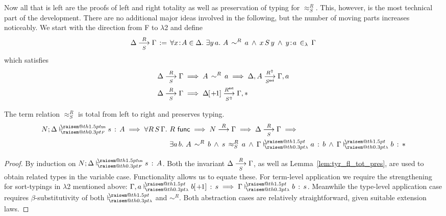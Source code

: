 \documentclass[a4paper,UKenglish]{lipics-v2016}
\makeatletter
\newcommand{\ms}{\,}
\newcommand{\mrel}[1]{\mathrel{\ms #1 \ms}}
\newcommand{\OF}{\mrel{:}}
\newcommand{\mAnd}{\mrel{\wedge}}
\newcommand{\mAll}[1]{\ensuremath{\forall} #1.\ms\ms}
\newcommand{\mEx}[1]{\ensuremath{\exists} #1.\ms\ms}
\newcommand{\eqdef}{\mrel{:=}}
\newcommand{\SysL}{$\lambda$2\xspace}
\newcommand{\tm}{\mathsf{tm}}
\newcommand{\of}{\ensuremath{\!:\!}}
\newcommand{\cc}[2]{#1;#2} %
\newcommand{\raisemath}[1]{\mathpalette{\raisem@th{#1}}}
\newcommand{\raisem@th}[3]{\raisebox{#1}{\ensuremath{#2#3}}}
\newcommand{\tsAnnot}[2]{\vdash\hspace{-.7em}^{\raisemath{1.5pt}{\scriptscriptstyle{#2}}}_{\raisemath{0.3pt}{\scriptscriptstyle{#1}}}} %
\newcommand{\tyF}{\tsAnnot{F}{\tm}}  %
\newcommand{\typingF}[3]{\ensuremath{{#1} \mathrel{\tyF} #2 \OF #3}}
\newcommand{\tyL}{\tsAnnot{\lambda}{}} %
\newcommand{\typingL}[3]{\ensuremath{{#1} \mathrel{\tyL} #2 \OF #3}}
\newcommand{\inL}{\mrel{\in_{\lambda}}}
\newcommand{\tyr}{\mathrel{\sim}}
\newcommand{\tmr}{\mathrel{\approx}}
\newcommand{\Rext}[1]{\ensuremath{#1^{\mathsf{ext}}}}
\newcommand{\Rshift}[1]{\ensuremath{#1^{\Uparrow}}}
\newcommand{\tyctxrelFL}[3]{\ensuremath{#1\mathrel{\mathop{\longrightarrow}^{#2}\limits}#3}}
\newcommand{\tmctxrelFL}[4]{\ensuremath{#1\mathrel{\mathop{\longrightarrow}^{#2}_{#3}\limits}#4}}
\newcommand{\Prp}{\ensuremath{\textrm{\textasteriskcentered}}}
\newcommand{\subst}[1]{\hphantom{|}\!\![{#1}]}
\newcommand{\shift}{\ensuremath{\hspace{0.1em}\mathsf{+}\hspace{0.08em}\!1}}
\makeatother
\begin{document}
Now all that is left are the proofs of left and right totality as well as preservation of typing for $\tmr^R_S$.
This, however, is the most technical part of the development.
There are no additional major ideas involved in the following, but the number of moving parts increases noticeably.
We start with the direction from F to \SysL and define
\begin{align*}
  \tmctxrelFL{\Delta}{R}{S}{\Gamma} \eqdef \mAll {x \of A \in \Delta} \mEx{y\,a} A\,\tyr^R\,a \mAnd x\,S\,y \mAnd y \of a \inL \Gamma
\end{align*}
which satisfies
\begin{align*}
  &\tmctxrelFL{\Delta}{R}{S}{\Gamma} \implies A\,\tyr^R\,a \implies \tmctxrelFL{\Delta,A}{\Rshift{R}}{\Rext{S}}{\Gamma,a}\\
  &\tmctxrelFL{\Delta}{R}{S}{\Gamma} \implies \tmctxrelFL{\Delta\subst{\shift}}{\Rext{R}}{\Rshift{S}}{\Gamma,\Prp}
\end{align*}
\begin{lemma}
  The term relation $\tmr^R_S$ is total from left to right and preserves typing.
  \begin{align*}
    \typingF{\cc{N}{\Delta}}{s}{A} \implies \mAll{R\,S\,\Gamma} &R\ms\ms\mathsf{func} \implies \tyctxrelFL{N}{R}{\Gamma} \implies \tmctxrelFL{\Delta}{R}{S}{\Gamma} \implies \\
                                                                &\mEx{a\,b} A\,\tyr^R\,b \mAnd s\,\tmr^R_S\,a \mAnd \typingL{\Gamma}{a}{b} \mAnd \typingL{\Gamma}{b}{\Prp}
  \end{align*}
\end{lemma}
\begin{proof}
  By induction on $\typingF{\cc{N}{\Delta}}{s}{A}$.
  Both the invariant $\tmctxrelFL{\Delta}{R}{S}{\Gamma}$, as well as Lemma~\ref{lem:tyr_fl_tot_pres}, are used to obtain related types in the variable case.
  Functionality allows us to equate these.
  For term-level application we require the strengthening for sort-typings in \SysL mentioned above: $\typingL{\Gamma,a}{b\subst{\shift}}{s} \implies \typingL{\Gamma}{b}{s}$.
  Meanwhile the type-level application case requires $\beta$-substitutivity of both $\tyL$ and $\tyr^R$.
  Both abstraction cases are relatively straightforward, given suitable extension laws.
\end{proof}
\end{document}
